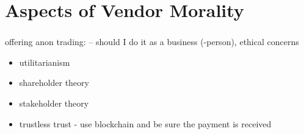 \section{Aspects of Vendor Morality}

\begin{frame}
    \frametitle{\insertsection}
    offering anon trading: -- should I do it as a business (-person), ethical concerns
    \begin{itemize}
        \item utilitarianism
        \item shareholder theory
        \item stakeholder theory
        \item trustless trust - use blockchain and be sure the payment is received
    \end{itemize}
\end{frame}